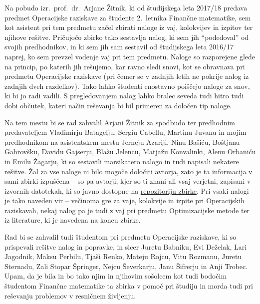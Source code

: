 Na pobudo izr.~prof.~dr.~Arjane Žitnik,
ki od študijskega leta 2017/18 predava predmet Operacijske raziskave
za študente 2.~letnika Finančne matematike,
sem kot asistent pri tem predmetu začel zbirati
naloge iz vaj, kolokvijev in izpitov ter njihove rešitve.
Pričujočo zbirko tako sestavlja \thetotal{} nalog,
ki sem jih ``podedoval'' od svojih predhodnikov,
in ki sem jih sam sestavil od študijskega leta 2016/17 naprej,
ko sem prevzel vodenje vaj pri tem predmetu.
Naloge so razporejene glede na princip, po katerih jih rešujemo,
kar ravno sledi snovi, kot se obravnava pri predmetu Operacijske raziskave
(pri čemer se v zadnjih letih ne pokrije nalog iz zadnjih dveh razdelkov).
Tako lahko študenti enostavno poiščejo naloge za snov, ki bi jo radi vadili.
S pregledovanjem nalog lahko bralec seveda tudi hitro tudi dobi občutek,
kateri način reševanja bi bil primeren za določen tip naloge.

Na tem mestu bi se rad zahvalil Arjani Žitnik za spodbudo
ter predhodnim predavateljem Vladimirju Batagelju, Sergiu Cabellu, Martinu Juvanu
in mojim predhodnikom na asistentskem mestu
Jerneju Azariji, Ninu Bašiću, Boštjanu Gabrovšku, Davidu Gajserju,
Blažu Jelencu, Matjažu Konvalinki, Alenu Orbaniću in Emilu Žagarju,
ki so sestavili marsikatero nalogo in tudi napisali nekatere rešitve.
Žal za vse naloge ni bilo mogoče določiti avtorja,
zato je ta informacija v sami zbirki izpuščena
-- so pa avtorji, kjer so ti znani ali vsaj verjetni,
zapisani v izvornih datotekah,
ki so javno dostopne na
\href{https://github.com/jaanos/or-zbirka}{repozitoriju zbirke}.
Pri vsaki nalogi je tako naveden vir
-- večinoma gre za vaje, kolokvije in izpite pri Operacijskih raziskavah,
nekaj nalog pa je tudi z vaj pri predmetu Optimizacijske metode
ter iz literature, ki je navedena na koncu zbirke.

Rad bi se zahvalil tudi študentom pri predmetu Operacijske raziskave,
ki so prispevali rešitve nalog in popravke,
in sicer Juretu Babniku, Evi Deželak, Lari Jagodnik, Maksu Perbilu, Tjaši Renko,
Mateju Rojcu, Vitu Rozmanu, Juretu Sternadu, Zali Stopar Špringer,
Nejcu Ševerkarju, Janu Šifrerju in Anji Trobec.
Upam,
da je bila in bo tako njim in njihovim sošolcem
kot tudi bodočim študentom Finančne matematike
ta zbirka v pomoč pri študiju
in morda tudi pri reševanju problemov v resničnem življenju.
